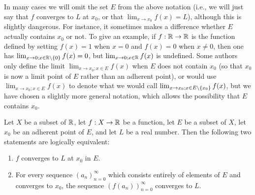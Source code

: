 \begin{rmk}\label{9.3.7}
  In many cases we will omit the set \(E\) from the above notation (i.e., we will just say that \(f\) converges to \(L\) at \(x_0\), or that \(\lim_{x \to x_0} f(x) = L\)), although this is slightly dangerous.
  For instance, it sometimes makes a difference whether \(E\) actually contains \(x_0\) or not.
  To give an example, if \(f : \mathbb{R} \to \mathbb{R}\) is the function defined by setting \(f(x) = 1\) when \(x = 0\) and \(f(x) = 0\) when \(x \neq 0\), then one has \(\lim_{x \to 0 ; x \in \mathbb{R} \setminus \left\lbrace0\right\rbrace} f(x) = 0\), but \(\lim_{x \to 0 ; x \in \mathbb{R}} f(x)\) is undefined.
  Some authors only define the limit \(\lim_{x \to x_0 ; x \in E} f(x)\) when \(E\) does not contain \(x_0\) (so that \(x_0\) is now a limit point of \(E\) rather than an adherent point), or would use \(\lim_{x \to x_0 ; x \in E} f(x)\) to denote what we would call \(\lim_{x \to x_0 ; x \in E \setminus \left\lbrace x_0\right\rbrace} f(x)\), but we have chosen a slightly more general notation, which allows the possibility that \(E\) contains \(x_0\).
\end{rmk}

\setcounter{thm}{8}
\begin{prop}\label{9.3.9}
  Let \(X\) be a subset of \(\mathbb{R}\), let \(f : X \to \mathbb{R}\) be a function, let \(E\) be a subset of \(X\), let \(x_0\) be an adherent point of \(E\), and let \(L\) be a real number.
  Then the following two statements are logically equivalent:
  \begin{enumerate}
    \item \(f\) converges to \(L\) at \(x_0\) in \(E\).
    \item For every sequence \((a_n)_{n = 0}^\infty\) which consists entirely of elements of \(E\) and converges to \(x_0\), the sequence \((f(a_n))_{n = 0}^\infty\) converges to \(L\).
  \end{enumerate}
\end{prop}

